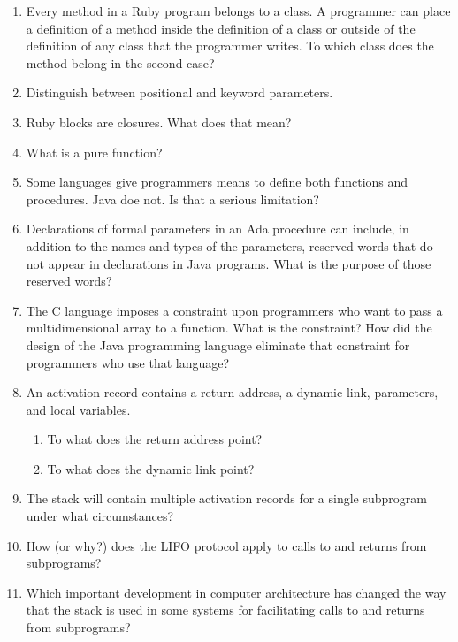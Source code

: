 \begin{enumerate}
  \item Every method in a Ruby program belongs to a class.
    A programmer can place a definition of a method inside
    the definition of a class or outside of the definition
    of any class that the programmer writes. To which class
    does the method belong in the second case?

  \item Distinguish between positional and keyword parameters.

  \item Ruby blocks are closures. What does that mean?

  \item What is a pure function?

  \item Some languages give programmers means to define
    both functions and procedures. Java doe not. Is that
    a serious limitation?

  \item Declarations of formal parameters in an Ada procedure
    can include, in addition to the names and types of the
    parameters, reserved words that do not appear in declarations
    in Java programs. 
    What is the purpose of those reserved words?
 
  \item The C language imposes a constraint upon programmers
    who want to pass a multidimensional array to a function.
    What is the constraint? How did the design of the Java
    programming language eliminate that constraint for 
    programmers who use that language?

  \item An activation record contains a return
    address, a dynamic link, parameters, and
    local variables.
  \begin{enumerate}
    \item To what does the return address point?
    \item To what does the dynamic link point?
    \end{enumerate}

  \item The stack will contain multiple activation
    records for a single subprogram under what
    circumstances?

  \item How (or why?) does the LIFO protocol apply to
    calls to and returns from subprograms?

  \item Which important development in computer architecture
    has changed the way that the stack is used in some
    systems for facilitating calls to and returns from
    subprograms?


\end{enumerate}
